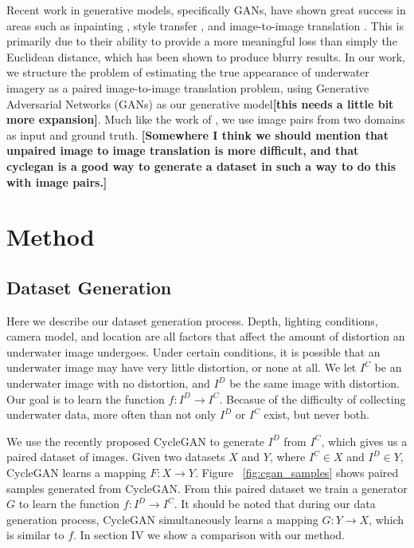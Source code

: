 \documentclass[letterpaper, 10pt, conference]{ieeeconf}
\newcommand{\marginlabel}[1]{\mbox{}\marginpar[\raggedleft\hspace{0pt}{#1}]{
\raggedright\hspace{0pt}{#1}}}
\newcommand{\starnote}[1]{\marginlabel{$\bigstar$}\textbf{[#1]}}
\begin{document}
Recent work in generative models, specifically GANs, have shown great success in areas such as inpainting 
\cite{pathak2016context}, style transfer \cite{Gatys_2016_CVPR}, and image-to-image translation 
\cite{isola2016image,zhu2017unpaired}. This is primarily due to their ability to provide a more meaningful loss than simply the 
Euclidean distance, which has been shown to produce blurry results. In our work, we structure the problem of estimating 
the true appearance of underwater imagery as a paired image-to-image translation problem, using Generative Adversarial Networks 
(GANs) as our generative model\starnote{this needs a little bit more expansion}. Much like the work of \cite{isola2016image}, we 
use image pairs from two domains as input and ground truth. \starnote{Somewhere I think we should mention that unpaired image to 
image translation is more difficult, and that cyclegan is a good way to generate a dataset in such a way to do this with image 
pairs.}

\section{Method}

\subsection{Dataset Generation}
Here we describe our dataset generation process. Depth, lighting conditions, camera
model, and location are all factors that affect the amount of distortion an underwater image undergoes. Under certain
conditions, it is possible that an underwater image may have very little distortion, or none at all.
We let $I^C$ be an underwater image with no distortion, and $I^D$
be the same image with distortion. Our goal is to learn the function $f: I^D \rightarrow I^C$. Becasue of the
difficulty of collecting underwater data, more often than not only $I^D$ or $I^C$ exist, but never both.

We use the recently proposed CycleGAN \cite{zhu2017unpaired} to generate $I^D$ from $I^C$, which gives us a paired
dataset of images. Given two datasets $X$ and $Y$, where $I^C \in X$ and $I^D \in Y$, CycleGAN learns a mapping
$F: X \rightarrow Y$. Figure ~\ref{fig:cgan_samples} shows paired samples generated from CycleGAN. From this paired dataset we train a
generator $G$ to learn the function $f: I^D \rightarrow I^C$. It should be noted that during our data generation process,
CycleGAN simultaneously learns a mapping $G: Y \rightarrow X$, which is similar to $f$. In section IV we show a comparison with our method.
\end{document}
